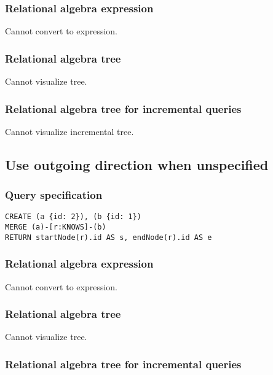 \subsubsection*{Relational algebra expression}

Cannot convert to expression.

\subsubsection*{Relational algebra tree}

Cannot visualize tree.

\subsubsection*{Relational algebra tree for incremental queries}

Cannot visualize incremental tree.

\subsection{Use outgoing direction when unspecified}

\subsubsection*{Query specification}

\begin{lstlisting}
CREATE (a {id: 2}), (b {id: 1})
MERGE (a)-[r:KNOWS]-(b)
RETURN startNode(r).id AS s, endNode(r).id AS e
\end{lstlisting}

\subsubsection*{Relational algebra expression}

Cannot convert to expression.

\subsubsection*{Relational algebra tree}

Cannot visualize tree.

\subsubsection*{Relational algebra tree for incremental queries}

